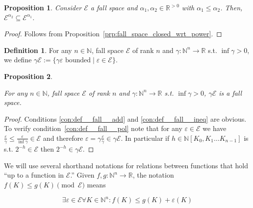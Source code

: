 \documentclass{article}
\numberwithin{equation}{section}
\theoremstyle{definition}
\newtheorem{definition}{Definition}[section]
\theoremstyle{plain}
\newtheorem{proposition}{Proposition}[section]
\newcommand{\Nats}{\mathbb{N}}
\newcommand{\Reals}{\mathbb{R}}
\newcommand{\NatPoly}{\Nats[K_0, K_1 \ldots K_{n-1}]}
\newcommand{\NatFun}{\Nats^n \rightarrow}
\newcommand{\Fall}{\mathcal{E}}
\begin{document}
\begin{proposition}

Consider $\Fall$ a fall space and $\alpha_1,\alpha_2 \in \Reals^{>0}$ with $\alpha_1 \leq \alpha_2$. Then, ${\Fall^{\alpha_2} \subseteq \Fall^{\alpha_1}}$.

\end{proposition}

\begin{proof}

Follows from Proposition~\ref{prp:fall_space_closed_wrt_power}.
\end{proof}

\begin{samepage}
\begin{definition}

For any $n \in \Nats$, fall space $\Fall$ of rank $n$ and $\gamma: \NatFun \Reals$ s.t. $\inf \gamma > 0$, we define $\gamma \Fall := \{\gamma \varepsilon \text{ bounded} \mid \varepsilon \in \Fall\}$.

\end{definition}
\end{samepage}

\begin{samepage}
\begin{proposition}
\label{prp:tbd}

For any $n \in \Nats$, fall space $\Fall$ of rank $n$ and $\gamma: \NatFun \Reals$ s.t. $\inf \gamma > 0$, $\gamma \Fall$ is a fall space.

\end{proposition}
\end{samepage}

\begin{proof}

Conditions \ref{con:def__fall__add} and \ref{con:def__fall__ineq} are obvious. To verify condition~\ref{con:def__fall__pol} note that for any $\varepsilon \in \Fall$ we have $\frac{\varepsilon}{\gamma} \leq \frac{\varepsilon}{\inf \gamma} \in \Fall$ and therefore $\varepsilon = \gamma \frac{\varepsilon}{\gamma} \in \gamma \Fall$. In particular if $h \in \NatPoly$ is s.t. $2^{-h} \in \Fall$ then $2^{-h} \in \gamma \Fall$.
%
\end{proof}

We will use several shorthand notations for relations between functions that hold \enquote{up to a function in ${\Fall}$.} Given $f,g: \NatFun \Reals$, the notation ${f(K) \leq g(K) \pmod \Fall}$ means 

\[\exists \varepsilon \in \Fall \forall K \in \Nats^n: f(K) \leq g(K) + \varepsilon(K)\]
\end{document}
